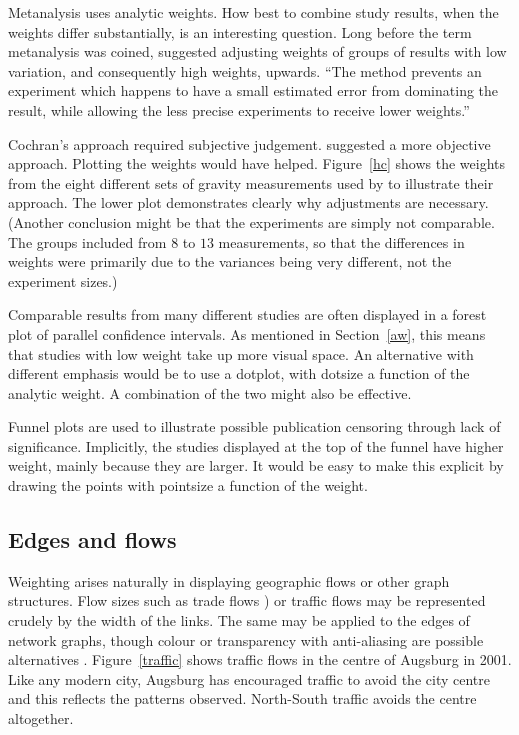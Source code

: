 \documentclass{svmult}
\begin{document}

Metanalysis uses analytic weights.  How best to combine study results, when the weights differ substantially, is an interesting question.  Long before the term metanalysis was coined, \cite{cochran:1954b} suggested adjusting weights of groups of results with low variation, and consequently high weights, upwards.  ``The method prevents an experiment which happens to have a small estimated error from dominating the result, while allowing the less precise experiments to receive lower weights.''

Cochran's approach required subjective judgement.  \cite{mosteller:1982} suggested a more objective approach.  Plotting the weights would have helped.  Figure~\ref{hc} shows the weights from the eight different sets of gravity measurements used by \cite{mosteller:1982} to illustrate their approach.  The lower plot demonstrates clearly why adjustments are necessary.  (Another conclusion might be that the experiments are simply not comparable.  The groups included from $8$ to $13$ measurements, so that the differences in weights were primarily due to the variances being very different, not the experiment sizes.)

Comparable results from many different studies are often displayed in a forest plot of parallel confidence intervals.  As mentioned in Section~\ref{aw}, this means that studies with low weight take up more visual space.  An alternative with different emphasis would be to use a dotplot, with dotsize a function of the analytic weight.  A combination of the two might also be effective.

Funnel plots are used to illustrate possible publication censoring through lack of significance.  Implicitly, the studies displayed at the top of the funnel have higher weight, mainly because they are larger.  It would be easy to make this explicit by drawing the points with pointsize a function of the weight.

\subsection{Edges and flows}
\label{edge}
Weighting arises naturally in displaying geographic flows or other graph structures.  Flow sizes such as trade flows \citep{unwin:1992}) or traffic flows may be represented crudely by the width of the links.  The same may be applied to the edges of network graphs, though colour or transparency with anti-aliasing are possible alternatives \citep{wills:2006}.  Figure~\ref{traffic} shows traffic flows in the centre of Augsburg in 2001.   Like any modern city, Augsburg has encouraged traffic to avoid the city centre and this reflects the patterns observed.  North-South traffic avoids the centre altogether.
\end{document}
